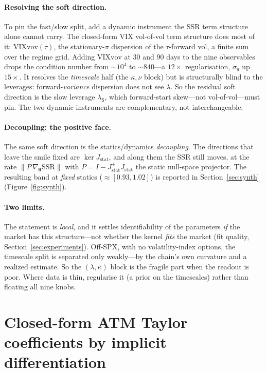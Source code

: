 \documentclass[11pt]{article}
\newcommand{\SSR}{\mathrm{SSR}}
\newcommand{\bth}{{\boldsymbol{\theta}}}
\begin{document}
\paragraph{Resolving the soft direction.} To pin the fast/slow split, add a dynamic
instrument the SSR term structure alone cannot carry. The closed-form VIX vol-of-vol term structure does most of it: $\mathrm{VIXvov}(\tau)$, the
stationary-$\pi$ dispersion of the $\tau$-forward vol, a finite sum over the regime grid. Adding
$\mathrm{VIXvov}$ at $30$ and $90$ days to the nine observables drops the condition number from
$\sim\!10^4$ to $\sim\!840$---a $12\times$ regularisation, $\sigma_9$ up $15\times$. It resolves the \emph{timescale} half (the $\kappa,\nu$ block) but is structurally blind to the
leverages: forward-\emph{variance} dispersion does not see $\lambda$. So the residual soft
direction is the slow leverage $\lambda_{\mathsf{S}}$, which forward-start skew---not
vol-of-vol---must pin. The
two dynamic instruments are complementary, not interchangeable.

\paragraph{Decoupling: the positive face.} The same soft direction is the statics/dynamics
\emph{decoupling}. The directions that leave the smile fixed are $\ker J_{\mathrm{stat}}$,
and along them the SSR still moves, at the rate $\|P\,\nabla_\bth\SSR\|$ with
$P=I-J_{\mathrm{stat}}^{+}J_{\mathrm{stat}}$ the static null-space projector. The resulting band at \emph{fixed}
statics ($\approx[0.93,1.02]$) is reported in Section~\ref{sec:synth} (Figure~\ref{fig:synth}).

\paragraph{Two limits.} The statement is \emph{local}, and it settles identifiability of the
parameters \emph{if} the market has this structure---not whether the kernel \emph{fits} the
market (fit quality, Section~\ref{sec:experiments}). Off-SPX, with no volatility-index options, the timescale split is separated only weakly---by
the chain's own curvature and a realized estimate. So the $(\lambda,\kappa)$ block is the fragile
part when the readout is poor. Where data is thin, regularise it (a prior on the timescales) rather
than floating all nine knobs.

\section{Closed-form ATM Taylor coefficients by implicit differentiation}
\label{app:glide}
\end{document}
